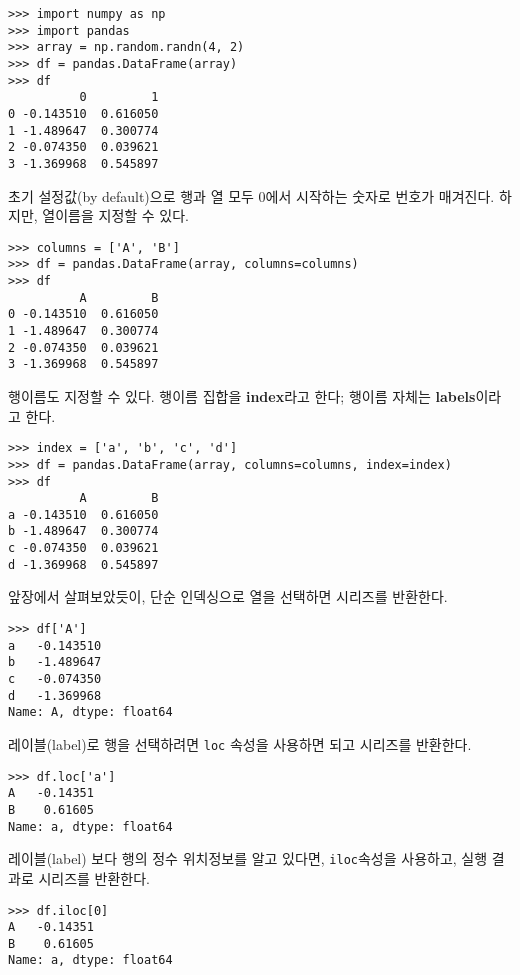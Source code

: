 
\begin{verbatim}
>>> import numpy as np
>>> import pandas
>>> array = np.random.randn(4, 2)
>>> df = pandas.DataFrame(array)
>>> df
          0         1
0 -0.143510  0.616050
1 -1.489647  0.300774
2 -0.074350  0.039621
3 -1.369968  0.545897
\end{verbatim}

초기 설정값(by default)으로 행과 열 모두 0에서 시작하는 숫자로 번호가 매겨진다. 하지만, 열이름을 지정할 수 있다.

\begin{verbatim}
>>> columns = ['A', 'B']
>>> df = pandas.DataFrame(array, columns=columns)
>>> df
          A         B
0 -0.143510  0.616050
1 -1.489647  0.300774
2 -0.074350  0.039621
3 -1.369968  0.545897
\end{verbatim}

행이름도 지정할 수 있다. 행이름 집합을 {\bf index}라고 한다; 
행이름 자체는 {\bf labels}이라고 한다.

\begin{verbatim}
>>> index = ['a', 'b', 'c', 'd']
>>> df = pandas.DataFrame(array, columns=columns, index=index)
>>> df
          A         B
a -0.143510  0.616050
b -1.489647  0.300774
c -0.074350  0.039621
d -1.369968  0.545897
\end{verbatim}

앞장에서 살펴보았듯이, 단순 인덱싱으로 열을 선택하면 시리즈를 반환한다.


\begin{verbatim}
>>> df['A']
a   -0.143510
b   -1.489647
c   -0.074350
d   -1.369968
Name: A, dtype: float64
\end{verbatim}

레이블(label)로 행을 선택하려면 {\tt loc} 속성을 사용하면 되고 시리즈를 반환한다.  

\begin{verbatim}
>>> df.loc['a']
A   -0.14351
B    0.61605
Name: a, dtype: float64
\end{verbatim}

레이블(label) 보다 행의 정수 위치정보를 알고 있다면, {\tt iloc}속성을 사용하고, 실행 결과로 시리즈를 반환한다.

\begin{verbatim}
>>> df.iloc[0]
A   -0.14351
B    0.61605
Name: a, dtype: float64
\end{verbatim}

